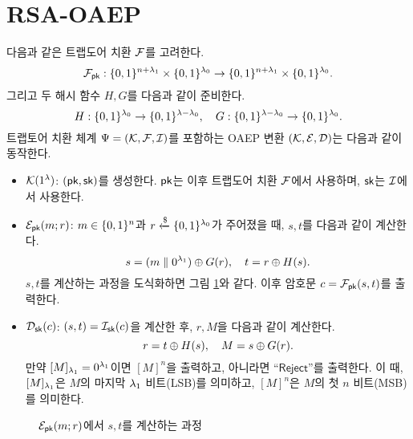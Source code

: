 \section{RSA-OAEP}

다음과 같은 트랩도어 치환 $\mathcal{F}$를 고려한다.
$$
	\mathcal{F}_{\textsf{pk}}: \{0, 1\}^{n + \lambda_1} \times \{0, 1\}^{\lambda_0} \to \{0, 1\}^{n + \lambda_1} \times \{0, 1\}^{\lambda_0}.
$$
그리고 두 해시 함수 $H, G$를 다음과 같이 준비한다.
$$
	H: \{0, 1\}^{\lambda_0} \to \{0, 1\}^{\lambda - \lambda_0}, \quad
	G: \{0, 1\}^{\lambda - \lambda_0} \to \{0, 1\}^{\lambda_0}.
$$
트랩토어 치환 체계 $\Psi = (\mathcal{K}, \mathcal{F}, \mathcal{I})$를 포함하는 OAEP 변환
$(\mathcal{K}, \mathcal{E}, \mathcal{D})$는 다음과 같이 동작한다.
\begin{itemize}
	\item $\mathcal{K}(1^{\lambda})$: $(\textsf{pk}, \textsf{sk})$를 생성한다. $\textsf{pk}$는 이후 트랩도어 치환
	$\mathcal{F}$에서 사용하며, $\textsf{sk}$는 $\mathcal{I}$에서 사용한다.
	\item $\mathcal{E}_{\textsf{pk}}(m; r)$: $m \in \{0, 1\}^{n}$과 $r \xleftarrow{\$} \{0, 1\}^{\lambda_0}$가
	주어졌을 때, $s, t$를 다음과 같이 계산한다.
	$$
		s = (m \parallel 0^{\lambda_1}) \oplus G(r), \quad
		t = r \oplus H(s).
	$$
	$s, t$를 계산하는 과정을 도식화하면 그림 \ref{fig:oaep}와 같다. 이후 암호문 $c
	= \mathcal{F}_{\textsf{pk}}(s, t)$를 출력한다.
  \item $\mathcal{D}_{\textsf{sk}}(c)$: $(s,t) = \mathcal{I}_{\textsf{sk}}(c)$을 계산한 후, $r, M$을 다음과 같이
  계산한다.
	$$
    	r = t \oplus H(s), \quad M = s \oplus G(r).
	$$
  	만약 $[M]_{\lambda_1} = 0^{\lambda_1}$이면 $[M]^{n}$을 출력하고, 아니라면
  	“$\textsf{Reject}$”를 출력한다. 이 때, $[M]_{\lambda_1}$은 $M$의 마지막 $\lambda_1$
  	비트(LSB)를 의미하고, $[M]^{n}$은 $M$의 첫 $n$ 비트(MSB)를 의미한다.
\end{itemize}

\begin{figure}[ht]
	\centering
	\caption{$\mathcal{E}_{\textsf{pk}}(m; r)$에서 $s, t$를 계산하는 과정}
	\label{fig:oaep}
\end{figure}
